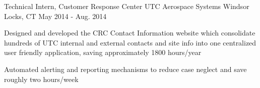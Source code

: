 \begin{cventries}
  \cventry
    {Technical Intern, Customer Response Center} %
    {UTC Aerospace Systems} %
    {Windsor Locks, CT} %
    {May 2014 - Aug. 2014} %
    {
      \begin{cvitems} %
        \item {Designed and developed the CRC Contact Information website which consolidate hundreds of UTC internal and external contacts and site info into one centralized user friendly application, saving approximately 1800 hours/year}
        \item {Automated alerting and reporting mechanisms to reduce case neglect and save roughly two hours/week}
      \end{cvitems}
    }


\end{cventries}
